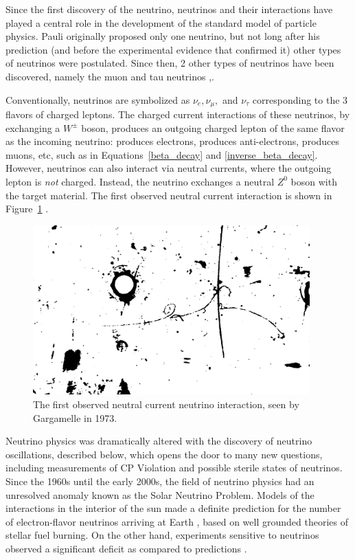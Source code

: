 Since the first discovery of the neutrino, neutrinos and their interactions have played a central role in the development of the standard model of particle physics.  Pauli originally proposed only one neutrino, but not long after his prediction (and before the experimental evidence that confirmed it) other types of neutrinos were postulated.   Since then, 2 other types of neutrinos have been discovered, namely the muon and tau neutrinos \cite{PhysRevLett.9.36},\cite{Kodama:2000mp}. 

Conventionally, neutrinos are symbolized as $\nu_e, \nu_\mu,$ and $\nu_\tau$ corresponding to the 3 flavors of charged leptons.  The charged current interactions of these neutrinos, by exchanging a $W^\pm$ boson, produces an outgoing charged lepton of the same flavor as the incoming neutrino: \nue produces electrons, \nuebar produces anti-electrons, \numu produces muons, etc, such as in Equations~\ref{beta_decay} and \ref{inverse_beta_decay}.  However, neutrinos can also interact via neutral currents, where the outgoing lepton is {\em not} charged.  Instead, the neutrino exchanges a neutral $Z^0$ boson with the target material.  The first observed neutral current interaction is shown in Figure~\ref{fig:gargamelle_nc} \cite{Hasert:1973ff}.

\begin{figure}[htbp]
  \centering
  \includegraphics[width=0.95\textwidth]{intro_figures/gargamelle_nc.png}
  \caption[First Observed Neutral Current Neutrino Interaction]{The first observed neutral current neutrino interaction, seen by Gargamelle in 1973.}
  \label{fig:gargamelle_nc}
\end{figure}


Neutrino physics was dramatically altered with the discovery of neutrino oscillations, described below, which opens the door to many new questions, including measurements of CP Violation and possible sterile states of neutrinos.  Since the 1960s until the early 2000s, the field of neutrino physics had an unresolved anomaly known as the Solar Neutrino Problem.  Models of the interactions in the interior of the sun made a definite prediction for the number of electron-flavor neutrinos arriving at Earth \cite{Bahcall:2004pz}, based on well grounded theories of stellar fuel burning.  On the other hand, experiments sensitive to neutrinos observed a significant deficit as compared to predictions \cite{Davis:1968cp}.  

